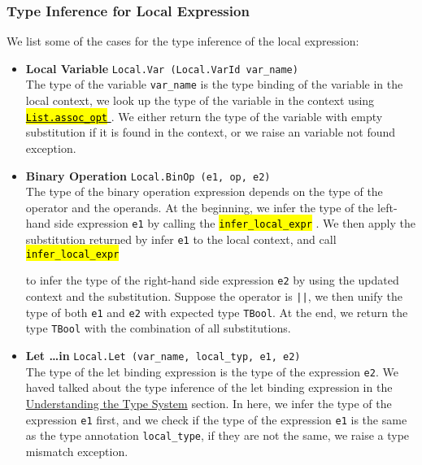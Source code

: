 \documentclass{article}
\newcommand{\highlighttexttt}[2][black]{ %
  \sethlcolor{cyan!10} %
  \texttt{\textcolor{#1}{\hl{#2}}}
}
\begin{document}
    \subsubsection{Type Inference for Local Expression}\label{local_expr}
        We list some of the cases for the type inference of the local expression:
        \begin{itemize}
            \item \textbf{Local Variable} \texttt{Local.Var (Local.VarId var\_name)}\\
                  The type of the variable \texttt{var\_name} is the type binding of the variable in the local context, we look up the type of the variable in the context
                  using \href{https://ocaml.org/manual/5.2/api/List.html#VALassoc_opt}{\highlighttexttt[orange]{List.assoc\_opt}}. We either
                  return the type of the variable with empty substitution if it is found in the context, or we raise an variable not found exception.
            \item \textbf{Binary Operation} \texttt{Local.BinOp (e1, op, e2)}\\
                  The type of the binary operation expression depends on the type of the operator and the operands.
                  At the beginning, we infer the type of the left-hand side expression \texttt{e1} by calling the \highlighttexttt{infer\_local\_expr}.
                  We then apply the substitution returned by infer \texttt{e1} to the local context, and call \highlighttexttt{infer\_local\_expr}
                  to infer the type of the right-hand side expression \texttt{e2} by using the updated context and the substitution.
                  Suppose the operator is \texttt{||}, we then unify the type of both \texttt{e1} and \texttt{e2} with expected type \texttt{TBool}.
                  At the end, we return the type \texttt{TBool} with the combination of all substitutions.
            \item \textbf{Let \ldots in} \texttt{Local.Let (var\_name, local\_typ, e1, e2)}\\
                  The type of the let binding expression is the type of the expression \texttt{e2}. We haved talked about the type inference of the
                  let binding expression in the \hyperref[understand_type_system]{Understanding the Type System} section. In here,
                  we infer the type of the expression \texttt{e1} first, and we check if the type of the expression \texttt{e1}
                  is the same as the type annotation \texttt{local\_type}, if they are not the same, we raise a type mismatch exception.

\end{itemize}
\end{document}
